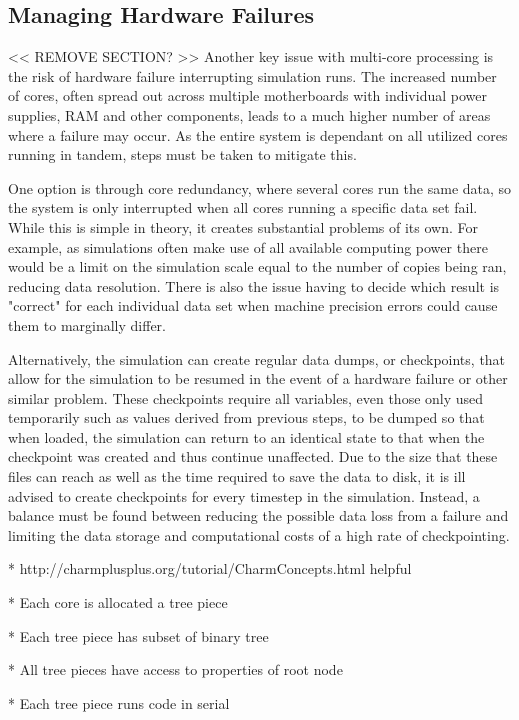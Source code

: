 \subsection{Managing Hardware Failures}

<< REMOVE SECTION? >>
Another key issue with multi-core processing is the risk of hardware failure interrupting simulation runs. The increased number of cores, often spread out across multiple motherboards with individual power supplies, RAM and other components, leads to a much higher number of areas where a failure may occur. As the entire system is dependant on all utilized cores running in tandem, steps must be taken to mitigate this. 

One option is through core redundancy, where several cores run the same data, so the system is only interrupted when all cores running a specific data set fail. While this is simple in theory, it creates substantial problems of its own. For example, as simulations often make use of all available computing power there would be a limit on the simulation scale equal to the number of copies being ran, reducing data resolution. There is also the issue having to decide which result is "correct" for each individual data set when machine precision errors could cause them to marginally differ. 

Alternatively, the simulation can create regular data dumps, or checkpoints, that allow for the simulation to be resumed in the event of a hardware failure or other similar problem. These checkpoints require all variables, even those only used temporarily such as values derived from previous steps, to be dumped so that when loaded, the simulation can return to an identical state to that when the checkpoint was created and thus continue unaffected. Due to the size that these files can reach as well as the time required to save the data to disk, it is ill advised to create checkpoints for every timestep in the simulation. Instead, a balance must be found between reducing the possible data loss from a failure and limiting the data storage and computational costs of a high rate of checkpointing.


* http://charmplusplus.org/tutorial/CharmConcepts.html helpful

* Each core is allocated a tree piece

* Each tree piece has subset of binary tree

* All tree pieces have access to properties of root node

* Each tree piece runs code in serial

